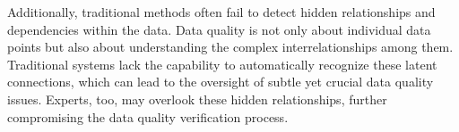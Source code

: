 Additionally, traditional methods often fail to detect hidden relationships and dependencies within the data. Data quality is not only about individual data points but also about understanding the complex interrelationships among them. Traditional systems lack the capability to automatically recognize these latent connections, which can lead to the oversight of subtle yet crucial data quality issues. Experts, too, may overlook these hidden relationships, further compromising the data quality verification process.




